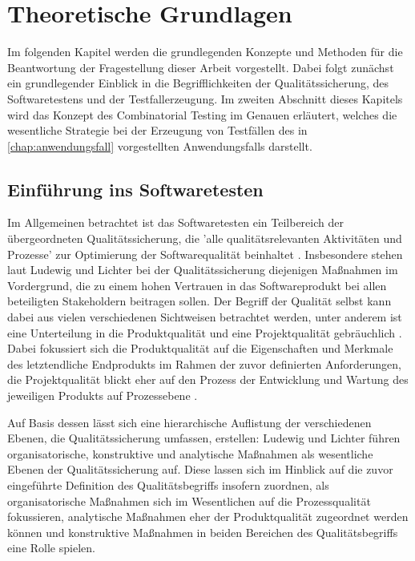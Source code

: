 \chapter{Theoretische Grundlagen}

Im folgenden Kapitel werden die grundlegenden Konzepte und Methoden für die Beantwortung der Fragestellung dieser Arbeit vorgestellt. Dabei folgt zunächst ein grundlegender Einblick in die Begrifflichkeiten der Qualitätssicherung, des Softwaretestens und der Testfallerzeugung. Im zweiten Abschnitt dieses Kapitels wird das Konzept des Combinatorial Testing im Genauen erläutert, welches die wesentliche Strategie bei der Erzeugung von Testfällen des in \autoref{chap:anwendungsfall} vorgestellten Anwendungsfalls darstellt.

\section{Einführung ins Softwaretesten}\label{sec:einführungTest}

Im Allgemeinen betrachtet ist das Softwaretesten ein Teilbereich der übergeordneten Qualitätssicherung, die 'alle qualitätsrelevanten Aktivitäten und Prozesse' zur Optimierung der Softwarequalität beinhaltet \cite[S. 269]{ludewig2010software}. Insbesondere stehen laut Ludewig und Lichter \cite{ludewig2010software} bei der Qualitätssicherung diejenigen Maßnahmen im Vordergrund, die zu einem hohen Vertrauen in das Softwareprodukt bei allen beteiligten Stakeholdern beitragen sollen. Der Begriff der Qualität selbst kann dabei aus vielen verschiedenen Sichtweisen betrachtet werden, unter anderem ist eine Unterteilung in die Produktqualität und eine Projektqualität gebräuchlich \cite[S. 66]{ludewig2010software}. Dabei fokussiert sich die Produktqualität auf die Eigenschaften und Merkmale des letztendliche Endprodukts im Rahmen der zuvor definierten Anforderungen, die Projektqualität blickt eher auf den Prozess der Entwicklung und Wartung des jeweiligen Produkts auf Prozessebene \cite[S. 66 ff.]{ludewig2010software}. 

Auf Basis dessen lässt sich eine hierarchische Auflistung der verschiedenen Ebenen, die Qualitätssicherung umfassen, erstellen: Ludewig und Lichter \cite[S. 271 ff.]{ludewig2010software} führen organisatorische, konstruktive und analytische Maßnahmen als wesentliche Ebenen der Qualitätssicherung auf. Diese lassen sich im Hinblick auf die zuvor eingeführte Definition des Qualitätsbegriffs insofern zuordnen, als organisatorische Maßnahmen sich im Wesentlichen auf die Prozessqualität fokussieren, analytische Maßnahmen eher der Produktqualität zugeordnet werden können und konstruktive Maßnahmen in beiden Bereichen des Qualitätsbegriffs eine Rolle spielen.

